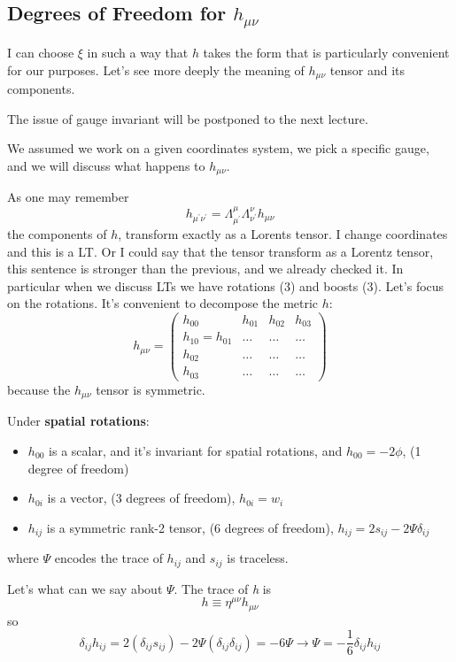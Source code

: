 \subsection{Degrees of Freedom for $h_{\mu \nu }$}
I can choose $\xi $ in such a way that $h$ takes the form that is particularly convenient for our purposes. Let's see more deeply the meaning of $h_{\mu \nu }$ tensor and its components.\par
The issue of gauge invariant will be postponed to the next lecture.\par
We assumed we work on a given coordinates system, we pick a specific gauge, and we will discuss what happens to $h_{\mu \nu }$.\par
As one may remember
\[
h_{\mu ^{\prime }\nu ^{\prime }} = \Lambda ^{\mu }_{\mu ^{\prime }} \Lambda ^{\nu }_{\nu ^{\prime }}h_{\mu \nu }
\]
the components of $h$, transform exactly as a Lorents tensor. I change coordinates and this is a LT. Or I could say that the tensor transform as a Lorentz tensor, this sentence is stronger than the previous, and we already checked it. In particular when we discuss LTs we have rotations (3) and boosts (3). Let's focus on the rotations. It's convenient to decompose the metric $h$:
\[
h_{\mu \nu } = \begin{pmatrix}
h_{00} & h_{01} & h_{02} & h_{03} \\
h_{10}=h_{01} & \ldots  & \ldots  & \ldots  \\
h_{02} & \ldots  & \ldots  & \ldots  \\
h_{03} & \ldots  & \ldots  & \ldots 
\end{pmatrix} 
\]
because the $h_{\mu \nu }$ tensor is symmetric.\par
Under \textbf{spatial rotations}:
\begin{itemize}
\item $h_{00}$ is a scalar, and it's invariant for spatial rotations, and $h_{00} = -2\phi $, (1 degree of freedom)
\item $h_{0i}$ is a vector, (3 degrees of freedom), $h_{0i} = w_{i}$
\item $h_{ij}$ is a symmetric rank-2 tensor, (6 degrees of freedom), $h_{ij} = 2s_{ij} -2\Psi \delta _{ij}$
\end{itemize}
where $\Psi $ encodes the trace of $h_{ij}$ and $s_{ij}$ is traceless.\par
Let's what can we say about $\Psi $. The trace of \emph{h} is 
\[
h \equiv \eta ^{\mu \nu } h_{\mu \nu }
\]
so 
\begin{equation}
	\delta _{ij}h_{ij} = 2\left( \delta _{ij}s_{ij} \right)-2\Psi \left( \delta _{ij}\delta _{ij} \right) = -6\Psi \to \Psi = -\frac{1}{6}\delta _{ij}h_{ij}
\end{equation}
